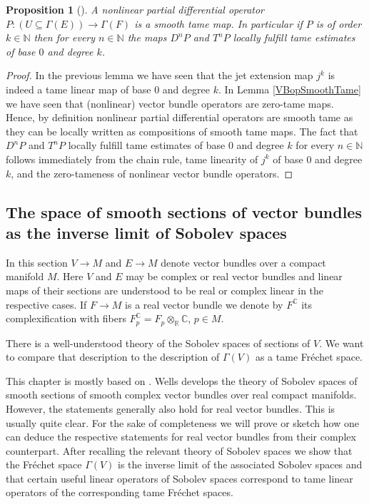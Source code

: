 \documentclass[12pt,a4paper]{article}
\theoremstyle{plain}
\newtheorem{proposition}[theorem]{Proposition}
\theoremstyle{definition}
\newcommand{\R}{\mathbb{R}}
\newcommand{\N}{\mathbb{N}}
\newcommand{\tens}{\otimes}
\begin{document}
\begin{proposition}[{\cite[Part II, Corollary 2.2.7]{hamilton}}]
\label{Prop:NonlinPartDiffOpsAreSmoothTame}
A nonlinear partial differential operator $P:(U\subseteq \Gamma(E))\to \Gamma(F)$ is a smooth tame map. In particular if $P$ is of order $k\in \N$ then for every $n\in \N$ the maps $D^nP$ and $T^nP$ locally fulfill tame estimates of base $0$ and degree $k$.     
\end{proposition}
\begin{proof}
In the previous lemma we have seen that the jet extension map $j^k$ is indeed a tame linear map of base $0$ and degree $k$. In Lemma \ref{VBopSmoothTame} we have seen that (nonlinear) vector bundle operators are zero-tame maps. Hence, by definition nonlinear partial differential operators are smooth tame as they can be locally written as compositions of smooth tame maps. The fact that $D^nP$ and $T^nP$ locally fulfill tame estimates of base $0$ and degree $k$ for every $n\in \N$ follows immediately from the chain rule, tame linearity of $j^k$ of base $0$ and degree $k$, and the zero-tameness of nonlinear vector bundle operators.     
\end{proof}


\subsection{The space of smooth sections of vector bundles as the inverse limit of Sobolev spaces}

In this section $V\to M$ and $E\to M$ denote vector bundles over a compact manifold $M$. Here $V$ and $E$ may be complex or real vector bundles and linear maps of their sections are understood to be real or complex linear in the respective cases. If $F\to M$ is a real vector bundle we denote by $F^{\mathbb C}$ its complexification with fibers $F^{\mathbb C}_p=F_p\tens_\R\mathbb C$, $p\in M$.

There is a well-understood theory of the Sobolev spaces of sections of $V$. We want to compare that description to the description of $\Gamma(V)$ as a tame Fréchet space.

This chapter is mostly based on \cite[Chapter IV]{Wells07}. Wells develops the theory of Sobolev spaces of smooth sections of smooth complex vector bundles over real compact manifolds. However, the statements generally also hold for real vector bundles. This is usually quite clear. For the sake of completeness we will prove or sketch how one can deduce the respective statements for real vector bundles from their complex counterpart.
After recalling the relevant theory of Sobolev spaces we show that the Fréchet space $\Gamma(V)$ is the inverse limit of the associated Sobolev spaces and that certain useful linear operators of Sobolev spaces correspond to tame linear operators of the corresponding tame Fréchet spaces.
\end{document}
